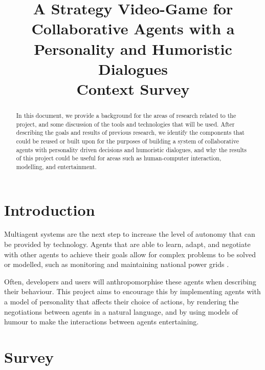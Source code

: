 \documentclass[conference]{IEEEtran}
\begin{document}
\title{A Strategy Video-Game for Collaborative Agents with a Personality and Humoristic Dialogues\\
{\large Context Survey}
}

\author{
\and
{}
\and
{}
}

\maketitle

\begin{abstract}

	In this document, we provide a background for the areas of research related to the project, and some discussion of the tools and technologies that will be used. After describing the goals and results of previous research, we identify the components that could be reused or built upon for the purposes of building a system of collaborative agents with personality driven decisions and humoristic dialogues, and why the results of this project could be useful for areas such as human-computer interaction, modelling, and entertainment. 

\end{abstract}

\section{Introduction}

Multiagent systems are the next step to increase the level of autonomy that can be provided by technology. Agents that are able to learn, adapt, and negotiate with other agents to achieve their goals allow for complex problems to be solved or modelled, such as monitoring and maintaining national power grids \cite{archon}. 

Often, developers and users will anthropomorphise these agents when describing their behaviour. This project aims to encourage this by implementing agents with a model of personality that affects their choice of actions, by rendering the negotiations between agents in a natural language, and by using models of humour to make the interactions between agents entertaining.

\section{Survey}
\end{document}
